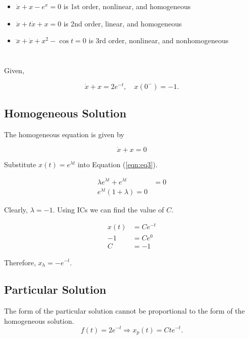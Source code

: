 \documentclass[12pt]{article}
\numberwithin{equation}{section}
\begin{document}
  \section{}

  \begin{itemize}
    \item $\dot x + x -e^x = 0$ is 1st order, nonlinear, and homogeneous
    \item $\ddot x + t\dot x + x = 0$ is 2nd order, linear, and homogeneous
    \item $\dddot x + \dot x + x ^2 - \cos t = 0$ is 3rd order, nonlinear, and nonhomogeneous
  \end{itemize}

  \newpage

  \section{}

  Given,

  \[
      \dot x + x = 2 e^{-t}, \quad x(0^{-}) = -1
    .\]

  \subsection{Homogeneous Solution}

  The homogeneous equation is given by

  \begin{equation} \label{eqn:eq3}
    \dot x + x = 0
  \end{equation}

  Substitute $ x(t) = e^{\lambda t} $ into Equation (\ref{eqn:eq3}).

  \begin{align}
    \lambda e^{\lambda t} + e^{\lambda t} &= 0 \\
    e^{\lambda t} (1 + \lambda) = 0
  \end{align}

  Clearly, $ \lambda = -1. $ Using ICs we can find the value of $ C. $

  \begin{align}
    x(t) &= Ce^{-t} \\
    -1 &= Ce^0 \\
    C &= -1
  \end{align}

  Therefore, $ x_h = -e^{-t}. $

  \newpage

  \subsection{Particular Solution}
  The form of the particular solution cannot be proportional to the form of the homogeneous solution.
  \[
      f(t) = 2e^{-t} \Rightarrow x_p(t) = Cte^{-t}
    .\]
\end{document}
